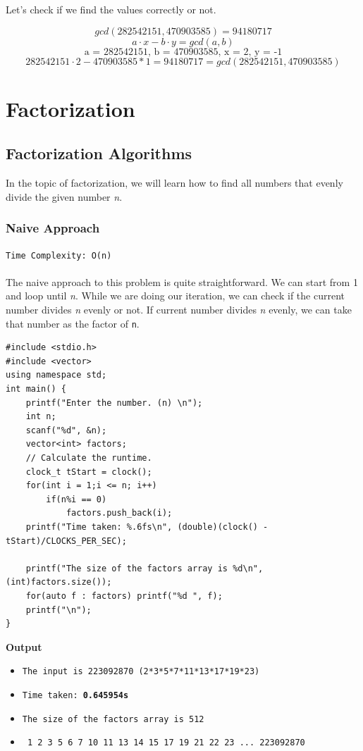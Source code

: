 \documentclass[12pt]{article}
\begin{document}
Let's check if we find the values correctly or not.

\[ gcd(282542151, 470903585) = 94180717 \]
\[ a \cdot x - b \cdot y = gcd(a,b) \]
\[ \text{a = 282542151, b = 470903585, x = 2, y = -1}\]
\[ 282542151\cdot2 - 470903585*1 = 94180717 = gcd(282542151, 470903585)\]

\clearpage

\section{Factorization}
\subsection{Factorization Algorithms}
In the topic of factorization, we will learn how to find all numbers that evenly divide the given number \textit{n}.

\subsubsection{Naive Approach}
\texttt{Time Complexity: O(n) } \\ \\
The naive approach to this problem is quite straightforward. We can start from 1 and loop until \textit{n}. While we are doing our iteration, we can check if the current number divides \textit{n} evenly or not. If current number divides \textit{n} evenly, we can take that number as the factor of \texttt{n}.

\begin{verbatim}
#include <stdio.h>
#include <vector>
using namespace std;
int main() {
    printf("Enter the number. (n) \n");
    int n;
    scanf("%d", &n);
    vector<int> factors;
    // Calculate the runtime.
    clock_t tStart = clock();
    for(int i = 1;i <= n; i++)
        if(n%i == 0)
            factors.push_back(i);
    printf("Time taken: %.6fs\n", (double)(clock() - tStart)/CLOCKS_PER_SEC);
    
    printf("The size of the factors array is %d\n", (int)factors.size());
    for(auto f : factors) printf("%d ", f);
    printf("\n");
}

\end{verbatim}
\textbf{Output}

\begin{itemize}
  \item \texttt{The input is 223092870 (2*3*5*7*11*13*17*19*23)} 
  \item \texttt{Time taken: \textbf{0.645954s}} 
  \item \texttt{The size of the factors array is 512}
  \item \texttt{ 1 2 3 5 6 7 10 11 13 14 15 17 19 21 22 23 ...  223092870 }
\end{itemize}
\end{document}
